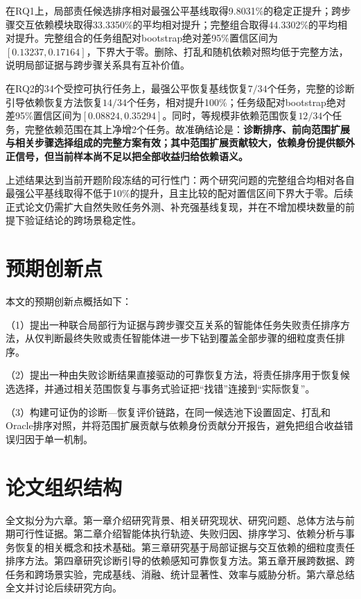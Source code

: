 在RQ1上，局部责任候选排序相对最强公平基线取得9.8031\%的稳定正提升；跨步骤交互依赖模块取得33.3350\%的平均相对提升；完整组合取得44.3302\%的平均相对提升。完整组合的任务组配对bootstrap绝对差95\%置信区间为$[0.13237, 0.17164]$，下界大于零。删除、打乱和随机依赖对照均低于完整方法，说明局部证据与跨步骤关系具有互补价值。

在RQ2的34个受控可执行任务上，最强公平恢复基线恢复$7/34$个任务，完整的诊断引导依赖恢复方法恢复$14/34$个任务，相对提升100\%；任务级配对bootstrap绝对差95\%置信区间为$[0.08824, 0.35294]$。同时，等规模非依赖范围恢复$12/34$个任务，完整依赖范围在其上净增2个任务。故准确结论是：\textbf{诊断排序、前向范围扩展与相关步骤选择组成的完整方案有效；其中范围扩展贡献较大，依赖身份提供额外正信号，但当前样本尚不足以把全部收益归给依赖语义。}

上述结果达到当前开题阶段冻结的可行性门：两个研究问题的完整组合均相对各自最强公平基线取得不低于10\%的提升，且主比较的配对置信区间下界大于零。后续正式论文仍需扩大自然失败任务外测、补充强基线复现，并在不增加模块数量的前提下验证结论的跨场景稳定性。

\section{预期创新点}

本文的预期创新点概括如下：

（1）提出一种联合局部行为证据与跨步骤交互关系的智能体任务失败责任排序方法，从仅判断最终失败或责任智能体进一步下钻到覆盖全部步骤的细粒度责任排序。

（2）提出一种由失败诊断结果直接驱动的可靠恢复方法，将责任排序用于恢复候选选择，并通过相关范围恢复与事务式验证把“找错”连接到“实际恢复”。

（3）构建可证伪的诊断—恢复评价链路，在同一候选池下设置固定、打乱和Oracle排序对照，并将范围扩展贡献与依赖身份贡献分开报告，避免把组合收益错误归因于单一机制。

\section{论文组织结构}

全文拟分为六章。第一章介绍研究背景、相关研究现状、研究问题、总体方法与前期可行性证据。第二章介绍智能体执行轨迹、失败归因、排序学习、依赖分析与事务恢复的相关概念和技术基础。第三章研究基于局部证据与交互依赖的细粒度责任排序方法。第四章研究诊断引导的依赖感知可靠恢复方法。第五章开展跨数据、跨任务和跨场景实验，完成基线、消融、统计显著性、效率与威胁分析。第六章总结全文并讨论后续研究方向。
